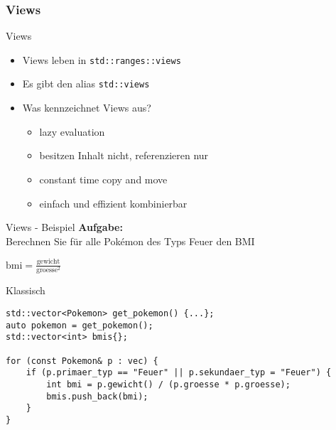 \subsubsection{Views}

\begin{frame}{Views}
    \begin{itemize}
        \item<1-> Views leben in \texttt{std::ranges::views}
        \item<2-> Es gibt den alias \texttt{std::views}
        \item<3-> Was kennzeichnet Views aus?
            \begin{itemize}
                \item<4-> lazy evaluation
                \item<5-> besitzen Inhalt nicht, referenzieren nur
                \item<6-> constant time copy and move
                \item<7-> einfach und effizient kombinierbar
            \end{itemize}
    \end{itemize}
\end{frame}


\begin{frame}{Views - Beispiel}
    \textbf{Aufgabe:}\\
    Berechnen Sie für alle Pokémon des Typs Feuer den BMI

    \vspace{2.5em}

    \begin{center}
        $\text{bmi} = \frac{\text{gewicht}}{\text{groesse}^2}$
    \end{center}
\end{frame}

\begin{frame}[fragile]{Klassisch}
    \begin{verbatim}
std::vector<Pokemon> get_pokemon() {...};
auto pokemon = get_pokemon();
std::vector<int> bmis{};

for (const Pokemon& p : vec) {
    if (p.primaer_typ == "Feuer" || p.sekundaer_typ = "Feuer") {
        int bmi = p.gewicht() / (p.groesse * p.groesse);
        bmis.push_back(bmi);
    }
}
    \end{verbatim}
\end{frame}

